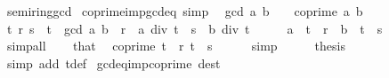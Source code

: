 \begin{isabellebody}
%
\isatagdocument
%
\isamarkuptrue%
%
\endisatagdocument
{\isafolddocument}%
%
\isadelimdocument
%
\endisadelimdocument
{}\isamarkupfalse%
\ semiring{\isacharunderscore}{\kern0pt}gcd\isanewline
{}\isanewline
\isanewline
{}\isamarkupfalse%
\ coprime{\isacharunderscore}{\kern0pt}imp{\isacharunderscore}{\kern0pt}gcd{\isacharunderscore}{\kern0pt}eq{\isacharunderscore}{\kern0pt}{}\ {\isacharbrackleft}{\kern0pt}simp{\isacharbrackright}{\kern0pt}{\isacharcolon}{\kern0pt}\isanewline
\ \ {\isachardoublequoteopen}gcd\ a\ b\ {\isacharequal}{\kern0pt}\ {}{\isachardoublequoteclose}\ \ {\isachardoublequoteopen}coprime\ a\ b{\isachardoublequoteclose}\isanewline
%
\isadelimproof
%
\endisadelimproof
%
\isatagproof
{}\isamarkupfalse%
\ {\isacharminus}{\kern0pt}\isanewline
\ \ \isamarkupfalse%
\ t\ r\ s\ \ {\isachardoublequoteopen}t\ {\isacharequal}{\kern0pt}\ gcd\ a\ b{\isachardoublequoteclose}\ \ {\isachardoublequoteopen}r\ {\isacharequal}{\kern0pt}\ a\ div\ t{\isachardoublequoteclose}\ \ {\isachardoublequoteopen}s\ {\isacharequal}{\kern0pt}\ b\ div\ t{\isachardoublequoteclose}\isanewline
\ \ \isamarkupfalse%
\ \isamarkupfalse%
\ {\isachardoublequoteopen}a\ {\isacharequal}{\kern0pt}\ t\ {\isacharasterisk}{\kern0pt}\ r{\isachardoublequoteclose}\ \ {\isachardoublequoteopen}b\ {\isacharequal}{\kern0pt}\ t\ {\isacharasterisk}{\kern0pt}\ s{\isachardoublequoteclose}\isanewline
\ \ \ \ \isamarkupfalse%
\ simp{\isacharunderscore}{\kern0pt}all\isanewline
\ \ \isamarkupfalse%
\ that\ \isamarkupfalse%
\ {\isachardoublequoteopen}coprime\ {\isacharparenleft}{\kern0pt}t\ {\isacharasterisk}{\kern0pt}\ r{\isacharparenright}{\kern0pt}\ {\isacharparenleft}{\kern0pt}t\ {\isacharasterisk}{\kern0pt}\ s{\isacharparenright}{\kern0pt}{\isachardoublequoteclose}\isanewline
\ \ \ \ \isamarkupfalse%
\ simp\isanewline
\ \ \isamarkupfalse%
\ \isamarkupfalse%
\ {\isacharquery}{\kern0pt}thesis\isanewline
\ \ \ \ \isamarkupfalse%
\ {\isacharparenleft}{\kern0pt}simp\ add{\isacharcolon}{\kern0pt}\ t{\isacharunderscore}{\kern0pt}def{\isacharparenright}{\kern0pt}\isanewline
{}\isamarkupfalse%
%
\endisatagproof
{\isafoldproof}%
%
\isadelimproof
\isanewline
%
\endisadelimproof
\isanewline
{}\isamarkupfalse%
\ gcd{\isacharunderscore}{\kern0pt}eq{\isacharunderscore}{\kern0pt}{}{\isacharunderscore}{\kern0pt}imp{\isacharunderscore}{\kern0pt}coprime\ {\isacharbrackleft}{\kern0pt}dest{\isacharbang}{\kern0pt}{\isacharbrackright}{\kern0pt}{\isacharcolon}{\kern0pt}\isanewline

\end{isabellebody}
